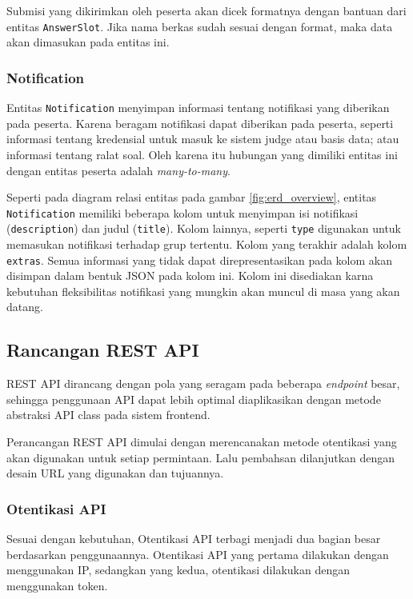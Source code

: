     Submisi yang dikirimkan oleh peserta akan dicek formatnya dengan bantuan dari entitas 
    \texttt{AnswerSlot}. Jika nama berkas sudah sesuai dengan format, maka data akan dimasukan
    pada entitas ini.
    
\subsubsection{Notification}
    Entitas \texttt{Notification} menyimpan informasi tentang notifikasi yang diberikan
    pada peserta. Karena beragam notifikasi dapat diberikan pada peserta, seperti informasi tentang
    kredensial untuk masuk ke sistem judge atau basis data; atau informasi tentang ralat soal.
    Oleh karena itu hubungan yang dimiliki entitas ini dengan entitas peserta adalah
    \textit{many-to-many}.
    
    Seperti pada diagram relasi entitas pada gambar \ref{fig:erd_overview}, entitas 
    \texttt{Notification} memiliki beberapa kolom untuk menyimpan isi notifikasi 
    (\texttt{description}) dan judul (\texttt{title}). Kolom lainnya, seperti \texttt{type} digunakan
    untuk memasukan notifikasi terhadap grup tertentu. Kolom yang terakhir adalah 
    kolom \texttt{extras}. Semua informasi yang tidak dapat direpresentasikan pada kolom akan
    disimpan dalam bentuk JSON pada kolom ini. Kolom ini disediakan karna kebutuhan fleksibilitas
    notifikasi yang mungkin akan muncul di masa yang akan datang.

\subsection{Rancangan REST API}
    REST API dirancang dengan pola yang seragam pada beberapa \textit{endpoint} besar, sehingga
    penggunaan API dapat lebih optimal diaplikasikan dengan metode abstraksi API class pada sistem
    frontend.
    
    Perancangan REST API dimulai dengan merencanakan metode otentikasi yang akan digunakan untuk
    setiap permintaan. Lalu pembahsan dilanjutkan dengan desain URL yang digunakan dan tujuannya.
    
\subsubsection{Otentikasi API}
    Sesuai dengan kebutuhan, Otentikasi API terbagi menjadi dua bagian besar berdasarkan penggunaannya.
    Otentikasi API yang pertama dilakukan dengan menggunakan IP, sedangkan yang kedua, otentikasi
    dilakukan dengan menggunakan token.
    
